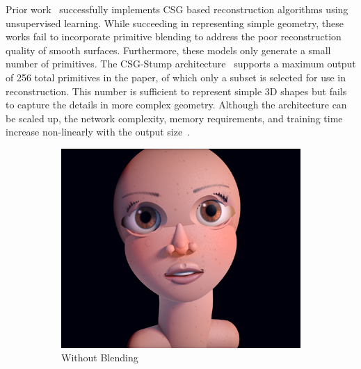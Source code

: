 Prior work~\cite{Sharma2018, Kania2020, Ren2021} successfully implements CSG based reconstruction algorithms using unsupervised learning. While succeeding in representing simple geometry, these works fail to incorporate primitive blending to address the poor reconstruction quality of smooth surfaces. Furthermore, these models only generate a small number of primitives. The CSG-Stump architecture~\cite{Ren2021} supports a maximum output of 256 total primitives in the paper, of which only a subset is selected for use in reconstruction. This number is sufficient to represent simple 3D shapes but fails to capture the details in more complex geometry. Although the architecture can be scaled up, the network complexity, memory requirements, and training time increase non-linearly with the output size~\cite{Ren2021}.

\begin{figure}[!b]
	\centering
	\begin{subfigure}[t]{0.45\textwidth}
		\centering
		\includegraphics[width=\textwidth]{Images/Face without blending}
		\caption{Without Blending}
	\end{subfigure}
	\hfill
	\begin{subfigure}[t]{0.45\textwidth}
		\centering

\end{subfigure}
\end{figure}
